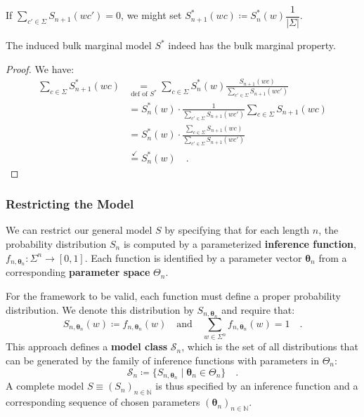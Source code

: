 \documentclass[../../main.tex]{subfiles}
\begin{document}
    \begin{remark}
        If $\sum_{c' \in \Sigma} S_{n+1}(wc') = 0$, we might set $S_{n + 1}^*(wc) \coloneqq S_n^*(w) \dfrac{1}{|\Sigma|}$.
    \end{remark}

    \begin{lemma}
        The induced bulk marginal model $S^*$ indeed has the bulk marginal property.
    \end{lemma}
    \vspace{-2.5em}
    \begin{proof}
        We have:
        \begin{align*}
            \sum_{c \in \Sigma} S_{n + 1}^*(wc) 
            &\underset{\text{def of } S^*}{=} \sum_{c \in \Sigma} S_n^*(w) \frac{S_{n+1}(wc)}{\sum_{c' \in \Sigma} S_{n+1}(wc')} \\
            &= S_n^*(w) \cdot \frac{1}{\sum_{c' \in \Sigma} S_{n+1}(wc')} \sum_{c \in \Sigma} S_{n+1}(wc) \\
            &= S_n^*(w) \cdot \frac{\sum_{c \in \Sigma} S_{n+1}(wc)}{\sum_{c' \in \Sigma} S_{n+1}(wc')} \\
            &\overset{\checkmark}{=} S_n^*(w) \quad .
        \end{align*}
    \end{proof}

\subsubsection{Restricting the Model}
    We can restrict our general model $S$ by specifying that for each length $n$, the probability distribution $S_n$ is computed by a parameterized \textbf{inference function}, $f_{n, \bm{\theta}_n}: \Sigma^n \to [0, 1]$. Each function is identified by a parameter vector $\bm{\theta}_n$ from a corresponding \textbf{parameter space} $\Theta_n$.

    For the framework to be valid, each function must define a proper probability distribution. We denote this distribution by $S_{n, \bm{\theta}_n}$ and require that:
    \[
        S_{n, \bm{\theta}_n}(w) \coloneqq f_{n, \bm{\theta}_n}(w) \quad \text{and} \quad \sum_{w \in \Sigma^n} f_{n, \bm{\theta}_n}(w) = 1 \quad .
    \]
    This approach defines a \textbf{model class} $\mathcal{S}_n$, which is the set of all distributions that can be generated by the family of inference functions with parameters in $\Theta_n$:
    \[
        \mathcal{S}_n \coloneqq \{ S_{n, \bm{\theta}_n} \mid \bm{\theta}_n \in \Theta_n \} \quad .
    \]
    A complete model $S \equiv (S_n)_{n \in \mathbb{N}}$ is thus specified by an inference function and a corresponding sequence of chosen parameters $(\bm{\theta}_n)_{n \in \mathbb{N}}$.
\end{document}
